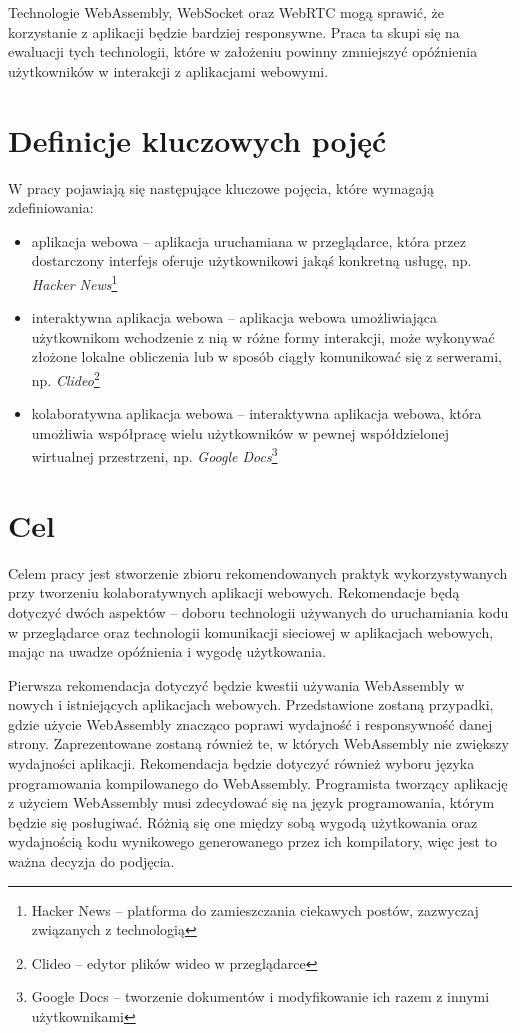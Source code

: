 \documentclass[language=polish,type=master]{aghmodern}
\begin{document}
Technologie WebAssembly, WebSocket oraz WebRTC mogą sprawić, że korzystanie z aplikacji będzie bardziej responsywne.
Praca ta skupi się na ewaluacji tych technologii, które w założeniu powinny zmniejszyć opóźnienia użytkowników w interakcji z aplikacjami webowymi.

\section{Definicje kluczowych pojęć}
W pracy pojawiają się następujące kluczowe pojęcia, które wymagają zdefiniowania:
\begin{itemize}
    \item aplikacja webowa -- aplikacja uruchamiana w przeglądarce, która przez dostarczony interfejs oferuje użytkownikowi jakąś konkretną usługę, np. \emph{Hacker News}\footnote{Hacker News -- platforma do zamieszczania ciekawych postów, zazwyczaj związanych z technologią}
    \item interaktywna aplikacja webowa -- aplikacja webowa umożliwiająca użytkownikom wchodzenie z nią w różne formy interakcji, może wykonywać złożone lokalne obliczenia lub w sposób ciągły komunikować się z serwerami, np. \emph{Clideo}\footnote{Clideo -- edytor plików wideo w przeglądarce}
    \item kolaboratywna aplikacja webowa -- interaktywna aplikacja webowa, która umożliwia współpracę wielu użytkowników w pewnej współdzielonej wirtualnej przestrzeni, np. \emph{Google Docs}\footnote{Google Docs -- tworzenie dokumentów i modyfikowanie ich razem z innymi użytkownikami}
\end{itemize}

\section{Cel}
Celem pracy jest stworzenie zbioru rekomendowanych praktyk wykorzystywanych przy tworzeniu kolaboratywnych aplikacji webowych.
Rekomendacje będą dotyczyć dwóch aspektów -- doboru technologii używanych do uruchamiania kodu w przeglądarce oraz technologii komunikacji sieciowej w aplikacjach webowych, mając na uwadze opóźnienia i wygodę użytkowania.

Pierwsza rekomendacja dotyczyć będzie kwestii używania WebAssembly w nowych i istniejących aplikacjach webowych.
Przedstawione zostaną przypadki, gdzie użycie WebAssembly znacząco poprawi wydajność i responsywność danej strony.
Zaprezentowane zostaną również te, w których WebAssembly nie zwiększy wydajności aplikacji.
Rekomendacja będzie dotyczyć również wyboru języka programowania kompilowanego do WebAssembly.
Programista tworzący aplikację z użyciem WebAssembly musi zdecydować się na język programowania, którym będzie się posługiwać.
Różnią się one między sobą wygodą użytkowania oraz wydajnością kodu wynikowego generowanego przez ich kompilatory, więc jest to ważna decyzja do podjęcia.
\end{document}
